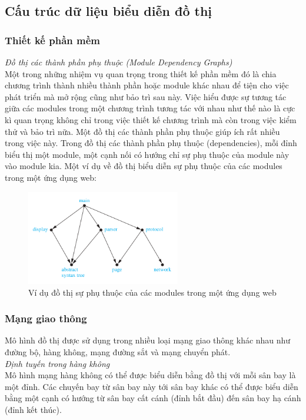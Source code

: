 \subsection{Cấu trúc dữ liệu biểu diễn đồ thị}
\subsubsection{Thiết kế phần mềm}
\textit{Đồ thị các thành phần phụ thuộc (Module Dependency Graphs)} \\
Một trong những nhiệm vụ quan trọng trong thiết kế phần mềm đó là chia chương trình
thành nhiều thành phần hoặc module khác nhau để tiện cho việc phát triển mà mở rộng
cũng như bảo trì sau này. Việc hiểu được sự tương tác giữa các modules trong một 
chương trình tương tác với nhau như thế nào là cực kì quan trọng không chỉ trong việc 
thiết kế chương trình mà còn trong việc kiểm thử và bảo trì nữa. Một đồ thị các thành 
phần phụ thuộc giúp ích rất nhiều trong việc này. Trong đồ thị các thành phần phụ thuộc 
(dependencies), mỗi đỉnh biểu thị một module, một cạnh nối có hướng chỉ sự phụ thuộc 
của module này vào module kia. Một ví dụ về đồ thị biểu diễn sự phụ thuộc của các modules
trong một ứng dụng web: 
\begin{figure}[H] %
    \centering %
    \includegraphics[width=0.6\textwidth]{assets/web_grp.png} 
    \caption{Ví dụ đồ thị sự phụ thuộc của các modules
    trong một ứng dụng web} %
    \label{fig:gr_1.2.1}
\end{figure}

\subsubsection{Mạng giao thông}
Mô hình đồ thị được sử dụng trong nhiều loại mạng giao thông khác nhau như đường bộ, 
hàng không, mạng đường sắt và mạng chuyển phát. \\

\textit{Định tuyến trong hàng không} \\
Mô hình mạng hàng không có thể được biểu diễn bằng đồ thị với mỗi sân bay là một đỉnh.
Các chuyến bay từ sân bay này tới sân bay khác có thể được biểu diễn bằng một cạnh 
có hướng từ sân bay cất cánh (đỉnh bắt đầu) đến sân bay hạ cánh (đỉnh kết thúc). \\

